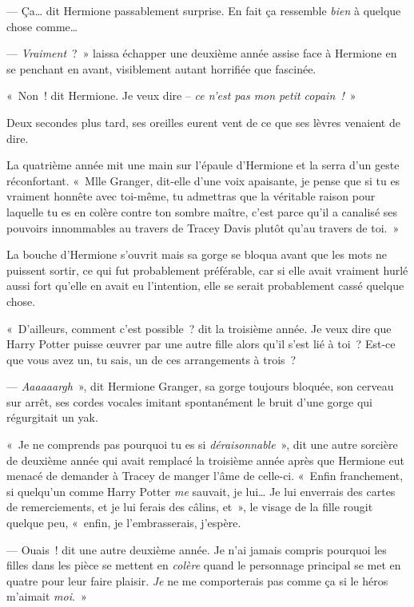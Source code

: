--- Ça… dit Hermione passablement surprise. En fait ça ressemble \emph{bien} à quelque chose comme…

--- \emph{Vraiment}~?~» laissa échapper une deuxième année assise face à Hermione en se penchant en avant, visiblement autant horrifiée que fascinée.

«~Non~! dit Hermione. Je veux dire -- \emph{ce n'est pas mon petit copain~!}~»

Deux secondes plus tard, ses oreilles eurent vent de ce que ses lèvres venaient de dire.

La quatrième année mit une main sur l'épaule d'Hermione et la serra d'un geste réconfortant. «~Mlle Granger, dit-elle d'une voix apaisante, je pense que si tu es vraiment honnête avec toi-même, tu admettras que la véritable raison pour laquelle tu es en colère contre ton sombre maître, c'est parce qu'il a canalisé ses pouvoirs innommables au travers de Tracey Davis plutôt qu'au travers de toi.~»

La bouche d'Hermione s'ouvrit mais sa gorge se bloqua avant que les mots ne puissent sortir, ce qui fut probablement préférable, car si elle avait vraiment hurlé aussi fort qu'elle en avait eu l'intention, elle se serait probablement cassé quelque chose.

«~D'ailleurs, comment c'est possible~? dit la troisième année. Je veux dire que Harry Potter puisse œuvrer par une autre fille alors qu'il s'est lié à toi~? Est-ce que vous avez un, tu sais, un de ces arrangements à trois~?

--- \emph{Aaaaaargh}~», dit Hermione Granger, sa gorge toujours bloquée, son cerveau sur arrêt, ses cordes vocales imitant spontanément le bruit d'une gorge qui régurgitait un yak.


«~Je ne comprends pas pourquoi tu es si \emph{déraisonnable}~», dit une autre sorcière de deuxième année qui avait remplacé la troisième année après que Hermione eut menacé de demander à Tracey de manger l'âme de celle-ci. «~Enfin franchement, si quelqu'un comme Harry Potter \emph{me} sauvait, je lui… Je lui enverrais des cartes de remerciements, et je lui ferais des câlins, et~», le visage de la fille rougit quelque peu, «~enfin, je l'embrasserais, j'espère.

--- Ouais~! dit une autre deuxième année. Je n'ai jamais compris pourquoi les filles dans les pièce se mettent en \emph{colère} quand le personnage principal se met en quatre pour leur faire plaisir. \emph{Je} ne me comporterais pas comme ça si le héros m'aimait \emph{moi}.~»

